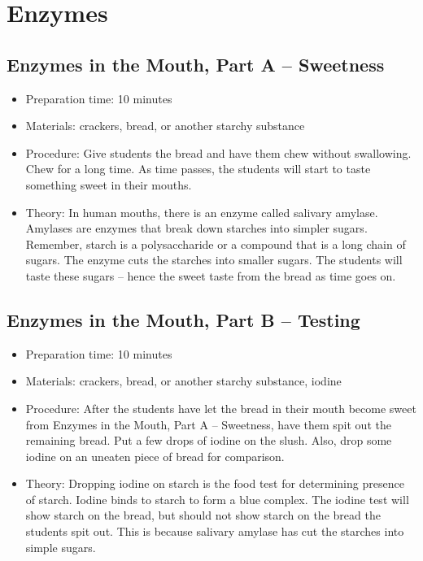 \section{Enzymes}
\subsection{Enzymes in the Mouth, Part A -- Sweetness}
\begin{itemize}
\item{Preparation time: 10 minutes}
\item{Materials: crackers, bread, or another starchy substance}
\item{Procedure: Give students the bread and have them chew without swallowing. Chew for a long time. As time passes, the students will start to taste something sweet in their mouths.}
\item{Theory: In human mouths, there is an enzyme called salivary amylase. Amylases are enzymes that break down starches into simpler sugars. Remember, starch is a polysaccharide or a compound that is a long chain of sugars. The enzyme cuts the starches into smaller sugars. The students will taste these sugars -- hence the sweet taste from the bread as time goes on.}
\end{itemize}

\subsection{Enzymes in the Mouth, Part B -- Testing}
\begin{itemize}
\item{Preparation time: 10 minutes}
\item{Materials: crackers, bread, or another starchy substance, iodine}
\item{Procedure: After the students have let the bread in their mouth become sweet from Enzymes in the Mouth, Part A -- Sweetness, have them spit out the remaining bread. Put a few drops of iodine on the slush. Also, drop some iodine on an uneaten piece of bread for comparison.}
\item{Theory: Dropping iodine on starch is the food test for determining presence of starch. Iodine binds to starch to form a blue complex. The iodine test will show starch on the bread, but should not show starch on the bread the students spit out. This is because salivary amylase has cut the starches into simple sugars.}
\end{itemize}

